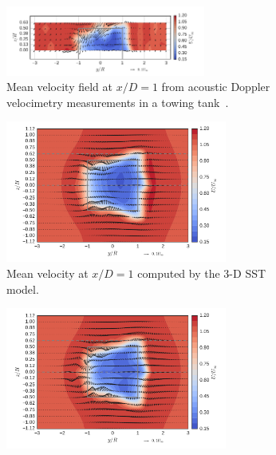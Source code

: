 \documentclass[aip,graphicx]{revtex4-1}
\begin{document}
\begin{figure}
    \centering
    \begin{subfigure}[b]{\textwidth}
        \centering

        \includegraphics[clip, trim=0 0.1in 0.3in 0.2in,
        width=0.72\textwidth]{meancontquiv_exp}

        \caption{Mean velocity field at $x/D=1$ from acoustic Doppler
        velocimetry measurements in a towing
        tank~\cite{Bachant2016-RVAT-Re-dep}.}

        \label{fig:br-cfd-meancontquiv-exp}
    \end{subfigure}

    \begin{subfigure}[b]{\textwidth}
        \centering

        \includegraphics[clip, trim=0 0.2in 0 0.15in,
        width=0.8\textwidth]{meancontquiv_kOmegaSST}

        \caption{Mean velocity at $x/D=1$ computed by the 3-D SST model.}

        \label{fig:meancontquiv-SST}
    \end{subfigure}

    \begin{subfigure}[b]{\textwidth}
        \centering

        \includegraphics[clip, trim=0 0.2in 0 0.15in,
        width=0.8\textwidth]{meancontquiv_SpalartAllmaras}


\end{subfigure}
\end{figure}
\end{document}
